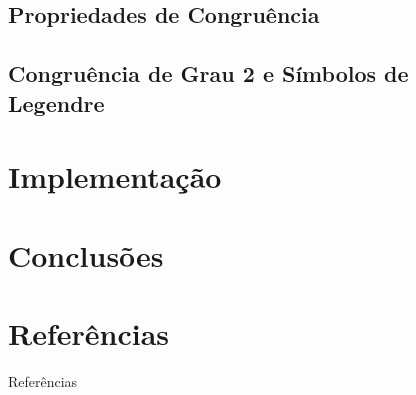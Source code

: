 \documentclass[xcolor=table]{beamer}
\begin{document}
        
        \subsection[]{Propriedades de Congruência} \label{sub:prop-cong}
        
        \subsection[]{Congruência de Grau 2 e Símbolos de Legendre} \label{sub:cong-grau2}
              

    
    
    \section[]{Implementação}

        
        

    \section[]{Conclusões}

        
   
    \section[]{Referências}
    \begin{frame}[allowframebreaks]{Referências}
        
    \end{frame}
\end{document}
